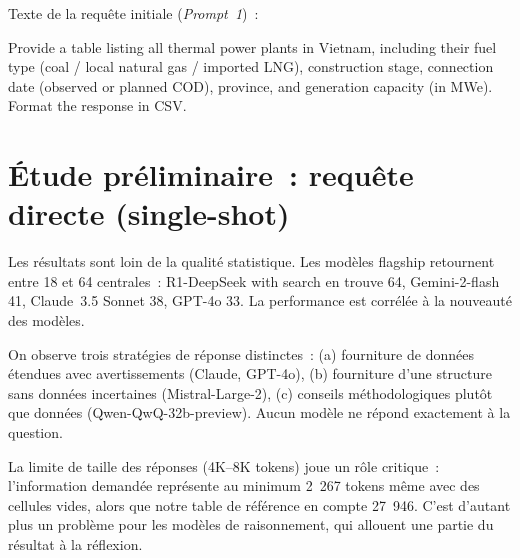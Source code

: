 \documentclass[a4paper,11pt]{report}
\begin{document}
Texte de la requête initiale (\emph{Prompt~1})~:

\begin{Prompt}
Provide a table listing all thermal power plants in Vietnam, including their
fuel type (coal / local natural gas / imported LNG), construction stage,
connection date (observed or planned COD), province, and generation capacity
(in MWe). Format the response in CSV.
\end{Prompt}

\section{Étude préliminaire~: requête directe (single-shot)}\label{sec:exp1}

Les résultats sont loin de la qualité statistique. Les modèles flagship retournent entre 18 et 64 centrales~: R1-DeepSeek with search en trouve 64, Gemini-2-flash 41, Claude~3.5 Sonnet 38, GPT-4o 33. La performance est corrélée à la nouveauté des modèles.

On observe trois stratégies de réponse distinctes~: (a) fourniture de données étendues avec avertissements (Claude, GPT-4o), (b) fourniture d'une structure sans données incertaines (Mistral-Large-2), (c) conseils méthodologiques plutôt que données (Qwen-QwQ-32b-preview). Aucun modèle ne répond exactement à la question.

La limite de taille des réponses (4K--8K tokens) joue un rôle critique~: l'information demandée représente au minimum 2~267 tokens même avec des cellules vides, alors que notre table de référence \citep{NLN8GPNI} en compte 27~946. C'est d'autant plus un problème pour les modèles de raisonnement, qui allouent une partie du résultat à la réflexion.


\end{document}
